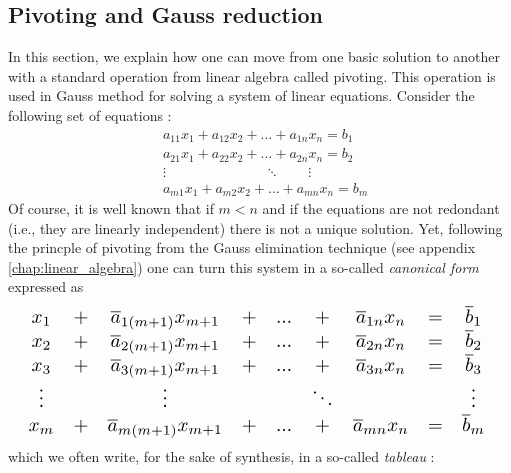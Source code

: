 \subsection{Pivoting and Gauss reduction}

In this section, we explain how one can move from one basic solution to another with a standard operation from linear algebra called pivoting. This operation is used in Gauss method for solving a system of linear equations. Consider the following set of equations :
\begin{align*}
&a_{11}x_1 + a_{12}x_2 + ... + a_{1n}x_n = b_1 \\
&a_{21}x_1 + a_{22}x_2 + ... + a_{2n}x_n = b_2 \\
&\vdots \qquad\qquad\qquad\quad\ddots\qquad \vdots \\
&a_{m1}x_1 + a_{m2}x_2 + ... + a_{mn}x_n = b_m
\end{align*}
Of course, it is well known that if $m < n$ and if the equations are not redondant (i.e., they are linearly independent) there is not a unique solution. Yet, following the princple of pivoting from the Gauss elimination technique (see appendix \ref{chap:linear_algebra}) one can turn this system in a so-called \textit{canonical form} expressed as 
\begin{equation*}
    \resizebox{\linewidth}{!}{$
    \begin{array}{ccccccccccccc}
        x_1 & + & \overline a_{1(m+1)}x_{m+1} & + & ... & + & \overline a_{1n}x_n & = & \overline b_1 \\
        x_2 & + & \overline a_{2(m+1)}x_{m+1} & + & ... & + & \overline a_{2n}x_n & = & \overline b_2 \\
        x_3 & + & \overline a_{3(m+1)}x_{m+1} & + & ... & + & \overline a_{3n}x_n & = & \overline b_3 \\
        \vdots & & \vdots & & & \ddots  & & & \vdots\\
        x_m & + & \overline a_{m(m+1)}x_{m+1} & + & ... & + & \overline a_{mn}x_n & = & \overline b_m \\
    \end{array}
    $
    }
\end{equation*}
which we often write, for the sake of synthesis, in a so-called \textit{tableau} :
